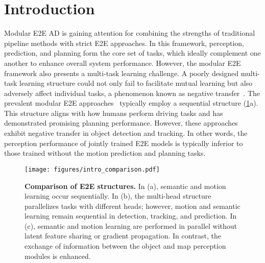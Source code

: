 \section{Introduction}
\label{sec:intro}




Modular \gls{E2E} \gls{AD} is gaining attention for combining the strengths of traditional pipeline methods with strict \gls{E2E} approaches. 
In this framework, perception, prediction, and planning form the core set of tasks, which ideally complement one another to enhance overall system performance.
However, the modular \gls{E2E} framework also presents a multi-task learning challenge.
A poorly designed multi-task learning structure could not only fail to facilitate mutual learning but also adversely affect individual tasks, a phenomenon known as negative transfer~\cite{crawshaw2020multi}.
The prevalent modular \gls{E2E} approaches~\cite{hu2023planning, jiang2023vad, zheng2025genad, sun2024sparsedrive} typically employ a sequential structure (\cref{fig:intro_compare}a).
This structure aligns with how humans perform driving tasks and has demonstrated promising planning performance. However, these approaches exhibit negative transfer in object detection and tracking. In other words, the perception performance of jointly trained \gls{E2E} models is typically inferior to those trained without the motion prediction and planning tasks. 

\begin{figure}[t]
    \centering
    \texttt{[image: figures/intro\_comparison.pdf]}
    \caption{\textbf{Comparison of \gls{E2E} structures.} In (a), semantic and motion learning occur sequentially. In (b), the multi-head structure parallelizes tasks with different heads; however, motion and semantic learning remain sequential in detection, tracking, and prediction. In (c), semantic and motion learning are performed in parallel without latent feature sharing or gradient propagation. In contrast, the exchange of information between the object and map perception modules is enhanced.}
    \label{fig:intro_compare}
\end{figure}

